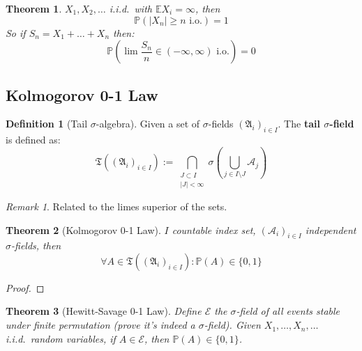 \documentclass[a4paper,11pt]{book}
\newtheorem{theorem}{Theorem}[section]
\theoremstyle{definition}
\newtheorem{definition}{Definition}[section]
\theoremstyle{remark}
\newtheorem*{remark}{Remark}
\begin{document}
\begin{theorem}
	$X_1, X_2, \dots$ i.i.d.\ with $\mathbb{E} X_i = \infty$, then
	\begin{equation*}
		\mathbb{P}(|X_n| \geq n \text{ i.o.}) = 1
	\end{equation*}
	So if $S_n = X_1 + \dots + X_n$ then:
	\begin{equation*}
		\mathbb{P}\!\left(\lim \frac{S_n}{n} \in (-\infty, \infty) \text{ i.o.}\right) = 0
	\end{equation*}
\end{theorem}


\subsection{Kolmogorov 0-1 Law}
\begin{definition}[Tail $\sigma$-algebra]
Given a set of $\sigma$-fields $(\mathfrak{A}_i)_{i \in I}$. The \textbf{tail $\sigma$-field} is defined as:
	\begin{equation*}
		\mathfrak{T}\!\left((\mathfrak{A}_i)_{i \in I}\right) := \bigcap_{\substack{J \subset I \\ |J| < \infty}} \sigma\!\left(\bigcup_{j \in I \setminus J} \mathcal{A}_j\right)
	\end{equation*}
\end{definition}
\begin{remark}
Related to the limes superior of the sets.
\end{remark}


\begin{theorem}[Kolmogorov 0-1 Law]
	$I$ countable index set, $(\mathcal{A}_i)_{i \in I}$ independent $\sigma$-fields, then
	\begin{equation*}
		\forall A \in \mathfrak{T}\!\left((\mathfrak{A}_i)_{i \in I}\right): \mathbb{P}(A) \in \{0, 1\}
	\end{equation*}
\end{theorem}
\begin{proof}

\end{proof}

\begin{theorem}[Hewitt-Savage 0-1 Law]
	Define $\mathcal{E}$ the $\sigma$-field of all events stable under finite permutation (prove it's indeed a $\sigma$-field). Given $X_1, \dots, X_n, \dots$ i.i.d.\ random variables, if $A \in \mathcal{E}$, then $\mathbb{P}(A) \in \{0, 1\}$.
\end{theorem}
\end{document}
